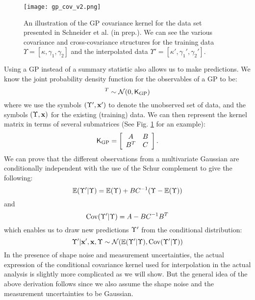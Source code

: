 \begin{figure}
	\centering
	\texttt{[image: gp\_cov\_v2.png]}
	\caption{An illustration of the GP covariance kernel for the data set
		presented in Schneider et al. (in prep.). We can see the various covariance
		and cross-covariance
		structures for the training data $\Upsilon = [\kappa, \gamma_1, \gamma_2]$
		and the interpolated data $\Upsilon' = [\kappa', \gamma_1', \gamma_2']$.
		\label{fig:GP_kernel_vis}}
\end{figure}
Using a GP instead of a summary statistic also allows us to make predictions. 
We know the joint probability density function for the observables of a GP to
be:
\begin{equation}
	[\lensparams',\lensparams]^T \sim \mathcal{N}(0, \kerngp_{\rm GP})
\end{equation}
where we use the symbols $(\Upsilon', \mathbf{x}')$ to denote the unobserved set of data,
and the symbols $(\Upsilon, \mathbf{x})$ for the existing (training) data.
We can then represent the kernel matrix in terms of several submatrices 
(See Fig. \ref{fig:GP_kernel_vis} for an example):
\begin{equation}
	\mathsf{K}_{\rm GP} = \left[\begin{array}{cc}
	A & B \\
	B^T & C 
\end{array} \right].	
\end{equation}
We can prove that the different observations from a multivariate Gaussian are 
conditionally independent with the use of the Schur complement to give the following:
\begin{equation}
	\mathbb{E}(\Upsilon'|\Upsilon) = \mathbb{E}(\Upsilon) + BC^{-1}(\Upsilon - \mathbb{E}(\Upsilon))
\end{equation}
and
\begin{equation}
	\mathrm{Cov}(\Upsilon'|\Upsilon) = A - BC^{-1}B^T
\end{equation}
which enables us to draw new predictions $\Upsilon'$ from the conditional distribution:
\begin{equation} 
	\Upsilon' | \mathbf{x}', \mathbf{x}, \Upsilon \sim \mathcal{N}(
		\mathbb{E}(\Upsilon'| \Upsilon), \mathrm{Cov}(\Upsilon'|\Upsilon)
	)
\end{equation}
In the presence of shape noise and measurement uncertainties, the actual 
expression of the conditional covariance kernel used for interpolation in the actual analysis 
is slightly more complicated as we will show. 
But the general idea of the above derivation follows 
since we also assume the shape noise and the measurement uncertainties to be Gaussian.

